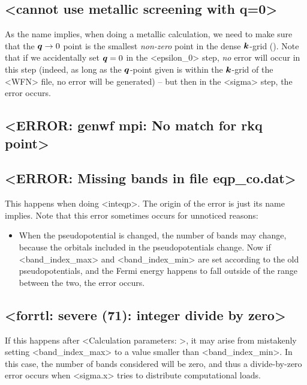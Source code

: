 \documentclass[hyperref, a4paper]{report}
\def\texttt#1{<#1>}%
\newcommand{\shortcode}[1]{\texttt{#1}}
\begin{document}
\subsection{\shortcode{cannot use metallic screening with q=0}}

As the name implies, 
when doing a metallic calculation,
we need to make sure that the $\vb*{q} \to 0$ point 
is the smallest \emph{non-zero} point in the dense $\vb*{k}$-grid 
().
Note that if we accidentally set $\vb*{q} = 0$ in the \shortcode{epsilon_0} step, 
\emph{no} error will occur in this step 
(indeed, as long as the $\vb*{q}$-point given is within the $\vb*{k}$-grid of the \shortcode{WFN} file, 
no error will be generated) -- 
but then in the \shortcode{sigma} step, 
the error occurs.

\subsection{\shortcode{ERROR: genwf mpi: No match for rkq point}}

\subsection{\shortcode{ERROR: Missing bands in file eqp_co.dat}}

This happens when doing \shortcode{inteqp}.
The origin of the error is just its name implies.
Note that this error sometimes occurs for unnoticed reasons:
\begin{itemize}
    \item When the pseudopotential is changed, 
    the number of bands may change,
    because the orbitals included in the pseudopotentials change.
    Now if \shortcode{band_index_max} and \shortcode{band_index_min}
    are set according to the old pseudopotentials,
    and the Fermi energy happens to fall outside of the range between the two,
    the error occurs.
\end{itemize}

\subsection{\shortcode{forrtl: severe (71): integer divide by zero}}

If this happens after \shortcode{Calculation parameters: },
it may arise from mistakenly setting \shortcode{band_index_max}
to a value smaller than \shortcode{band_index_min}.
In this case, 
the number of bands considered will be zero,
and thus a divide-by-zero error occurs 
when \shortcode{sigma.x} tries to distribute computational loads.
\end{document}
